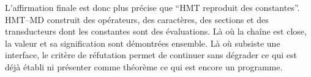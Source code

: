L'affirmation finale est donc plus précise que ``HMT reproduit des
constantes''. HMT--MD construit des opérateurs, des caractères, des sections et des
transducteurs dont les constantes sont des évaluations. Là où la chaîne
est close, la valeur et sa signification sont démontrées ensemble. Là où subsiste une
interface, le critère de réfutation permet de continuer sans dégrader ce qui est déjà établi ni
présenter comme théorème ce qui est encore un programme.
